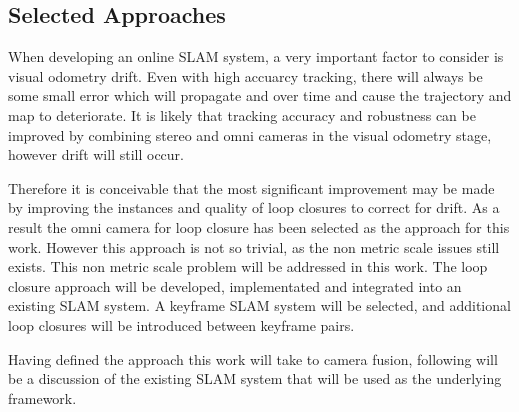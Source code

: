 \subsection{Selected Approaches}
\label{subsec:selected_approach}

When developing an online SLAM system, a very important factor to consider is visual odometry drift.  Even with high accuarcy tracking, there will always be some small error which will propagate and over time and cause the trajectory and map to deteriorate. It is likely that tracking accuracy and robustness can be improved by combining stereo and omni cameras in the visual odometry stage, however drift will still occur.

Therefore it is conceivable that the most significant improvement may be made by improving the instances and quality of loop closures to correct for drift.  As a result the omni camera for loop closure has been selected as the approach for this work.  However this approach is not so trivial, as the non metric scale issues still exists.  This non metric scale problem will be addressed in this work.  The loop closure approach will be developed, implementated and integrated into an existing SLAM system.  A keyframe SLAM system will be selected, and additional loop closures will be introduced between keyframe pairs.

Having defined the approach this work will take to camera fusion, following will be a discussion of the existing SLAM system that will be used as the underlying framework.